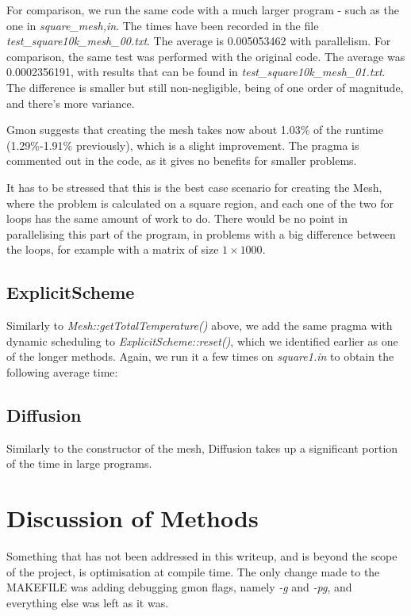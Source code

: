 \documentclass[11pt,journal]{IEEEtran}
\begin{document}
	For comparison, we run the same code with a much larger program - such as the one in \emph{square\_mesh,in}. The times have been recorded in the file \emph{test\_square10k\_mesh\_00.txt}. The average is 0.005053462 with parallelism. For comparison, the same test was performed with the original code. The average was 0.0002356191, with results that can be found in \emph{test\_square10k\_mesh\_01.txt}. The difference is smaller but still non-negligible, being of one order of magnitude, and there's more variance.
	
	Gmon suggests that creating the mesh takes now about 1.03\% of the runtime (1.29\%-1.91\% previously), which is a slight improvement. The pragma is commented out in the code, as it gives no benefits for smaller problems.
	
	
	
	

	It has to be stressed that this is the best case scenario for creating the Mesh, where the problem is calculated on a square region, and each one of the two for loops has the same amount of work to do. There would be no point in parallelising this part of the program, in problems with a big difference between the loops, for example with a matrix of size $1 \times 1000$.
	
	\subsection{ExplicitScheme}
	
	Similarly to \emph{Mesh::getTotalTemperature()} above, we add the same pragma with dynamic scheduling to \emph{ExplicitScheme::reset()}, which we identified earlier as one of the longer methods. Again, we run it a few times on \emph{square1.in} to obtain the following average time:
	
	\subsection{Diffusion}
	Similarly to the constructor of the mesh, Diffusion takes up a significant portion of the time in large programs.

	
	\section{Discussion of Methods}
	Something that has not been addressed in this writeup, and is beyond the scope of the project, is optimisation at compile time. The only change made to the MAKEFILE was adding debugging gmon flags, namely \emph{-g} and \emph{-pg}, and everything else was left as it was.
	
\end{document}
